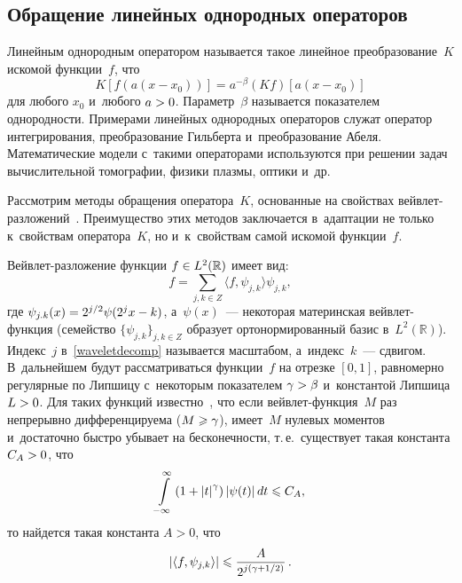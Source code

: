 \begin{multicols}{2}
\section{Обращение линейных однородных операторов}

Линейным однородным оператором называется такое линейное преобразование~$K$ искомой функции~$f$, что
$$
K\left[f(a(x-x_0))\right]=a^{-\beta}(Kf)\left[a(x-x_0)\right]
$$
для любого $x_0$ и~любого $a\hm>0$. Параметр~$\beta$ называется показателем однородности. 
Примерами линейных однородных операторов служат оператор интегрирования, 
преобразование Гильберта и~преобразование Абеля. Математические 
модели с~такими операторами используются при решении задач 
вычислительной томографии, физики плазмы, оптики и~др.

Рассмотрим методы обращения оператора~$K$, 
основанные на свойствах вейв\-лет-раз\-ло\-же\-ний~\cite{D94, Lee97, AS98}. 
Преимущество этих методов заключается в~адап\-та\-ции не 
только к~свойствам оператора~$K$, но и~к~свойствам самой искомой функции~$f$.

Вейвлет-разложение функции $f\hm\in L^2(\mathbb{R})$ имеет вид:
%
\begin{equation}                                                                   
\label{waveletdecomp}
f = \sum\limits_{j,k\in Z} \langle f,\psi_{j,k}\rangle  \psi_{j,k},
\end{equation}
%
где $\psi_{j.k}(x)\hm=2^{j/2}\psi(2^jx-k)$, 
а~$\psi(x)$~--- некоторая материнская вейв\-лет-функ\-ция (семейство $\{\psi_{j,k}\}_{j,k\in Z}$ 
образует ортонормированный базис в~$L^2(\mathbb{R})$). Индекс~$j$ 
в~\eqref{waveletdecomp} называется масштабом, а~индекс~$k$~--- сдвигом. 
В~дальнейшем будут рассматриваться функции~$f$ на отрезке $[0,1]$, 
равномерно регулярные по Липшицу с~некоторым показателем $\gamma\hm>\beta$ 
и~константой Липшица $L\hm>0$. Для таких функций известно~\cite{Mall99}, 
что если вейв\-лет-функ\-ция~$M$ раз непрерывно дифференцируема ($M\hm\geqslant\gamma$),
 имеет~$M$ нулевых моментов и~достаточно быстро убывает на бесконечности, 
 т.\,е.\ существует такая константа $C_A\hm>0$, что
$$
\int\limits_{-\infty}^{\infty}\left(1+\left\vert t\right\vert^{\gamma}\right)
\left\vert\psi(t)\right\vert dt\leqslant C_A,
$$
то найдется такая константа $A>0$, что
%
\begin{equation}                                                                      
\label{Coeff_Decay}
\left\vert\langle f, \psi_{j,k} \rangle\right\vert \leqslant \displaystyle\frac{\displaystyle A\mathstrut}{\displaystyle 2^{j \left( \gamma + 1/2 \right)}\mathstrut}\,.
\end{equation}


\end{multicols}
